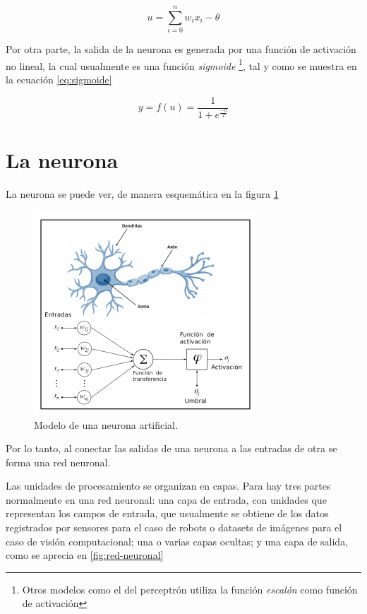 \documentclass[a4paper,12pt,twocolumn]{article}
\begin{document}
  \begin{equation}
    u = \sum_{i = 0}^{n} w_ix_i - \theta \label{eq:umbral}
  \end{equation}

  Por otra parte, la salida de la neurona es generada por una función de
  activación no lineal, la cual usualmente es una función \textit{sigmoide}
  \footnote{Otros modelos como el del perceptrón utiliza la función
  \textit{escalón} como función de activación}, tal y como se muestra en la
  ecuación \ref{eq:sigmoide}

  \begin{equation}
    y = f(u) = \dfrac{1}{1+e^{\frac{-u}{T}}}\label{eq:sigmoide}
  \end{equation}

  \section{La neurona}

  La neurona se puede ver, de manera esquemática en la figura \ref{fig:neurona}

  \begin{figure}[ht!]
    \centering
    \includegraphics[width=0.6\linewidth]{neurona}
    \caption[Modelo de neurona artificial]{Modelo de una neurona artificial.}
    \label{fig:neurona}
  \end{figure}

  Por lo tanto, al conectar las salidas de una neurona a las entradas de otra se
  forma una red neuronal.

  Las unidades de procesamiento se organizan en capas. Para \cite{article01} hay
  tres partes normalmente en una red neuronal: una capa de entrada, con unidades
  que representan los campos de entrada, que usualmente se obtiene de los datos
  registrados por sensores para el caso de robots o datasets de imágenes para el
  caso de visión computacional; una o varias capas ocultas; y una capa de
  salida, como se aprecia en \ref{fig:red-neuronal}
\end{document}

